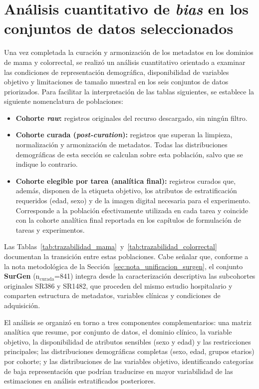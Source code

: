 \section{Análisis cuantitativo de \textit{bias} en los conjuntos de datos seleccionados}
\label{sec:analisis_cuantitativo_bias}

Una vez completada la curación y armonización de los metadatos en los dominios de mama y colorrectal, se realizó un análisis cuantitativo orientado a examinar las condiciones de representación demográfica, disponibilidad de variables objetivo y limitaciones de tamaño muestral en los seis conjuntos de datos priorizados. Para facilitar la interpretación de las tablas siguientes, se establece la siguiente nomenclatura de poblaciones:

\begin{itemize}
    \item \textbf{Cohorte \textit{raw}:} registros originales del recurso descargado, sin ningún filtro.
    \item \textbf{Cohorte curada (\textit{post-curation}):} registros que superan la limpieza, normalización y armonización de metadatos. Todas las distribuciones demográficas de esta sección se calculan sobre esta población, salvo que se indique lo contrario.
    \item \textbf{Cohorte elegible por tarea (analítica final):} registros curados que, además, disponen de la etiqueta objetivo, los atributos de estratificación requeridos (edad, sexo) y de la imagen digital necesaria para el experimento. Corresponde a la población efectivamente utilizada en cada tarea y coincide con la cohorte analítica final reportada en los capítulos de formulación de tareas y experimentos.
\end{itemize}

Las Tablas~\ref{tab:trazabilidad_mama}~y~\ref{tab:trazabilidad_colorrectal} documentan la transición entre estas poblaciones. Cabe señalar que, conforme a la nota metodológica de la Sección~\ref{sec:nota_unificacion_surgen}, el conjunto \textbf{SurGen} (n$_{\text{curada}}$=841) integra desde la caracterización descriptiva las subcohortes originales SR386 y SR1482, que proceden del mismo estudio hospitalario y comparten estructura de metadatos, variables clínicas y condiciones de adquisición.

El análisis se organizó en torno a tres componentes complementarios: una matriz analítica que resume, por conjunto de datos, el dominio clínico, la variable objetivo, la disponibilidad de atributos sensibles (sexo y edad) y las restricciones principales; las distribuciones demográficas completas (sexo, edad, grupos etarios) por cohorte; y las distribuciones de las variables objetivo, identificando categorías de baja representación que podrían traducirse en mayor variabilidad de las estimaciones en análisis estratificados posteriores.

